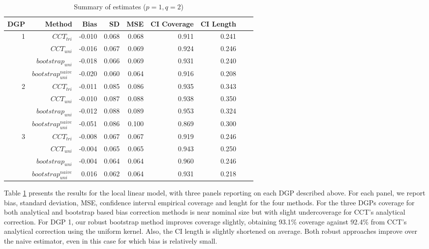 \documentclass[12pt,fleqn]{article}
\begin{document}
\begin{table}[t]
\centering
\begin{tabular}{rrrrrrrrr}
  \toprule
	DGP & Method    & Bias    & SD    & MSE   & CI Coverage & CI Length \\
  \midrule
	1 & $CCT_{tri}$ & -0.010 & 0.068 & 0.068 & 0.911 & 0.241 \\ 
	  & $CCT_{uni}$ & -0.016 & 0.067 & 0.069 & 0.924 & 0.246 \\ 
	  & $bootstrap_{uni}$ & -0.018 & 0.066 & 0.069 & 0.931 & 0.240 \\ 
	  & $bootstrap_{uni}^{naive}$ & -0.020 & 0.060 & 0.064 & 0.916 & 0.208 \\
	\midrule
	2 & $CCT_{tri}$ & -0.011 & 0.085 & 0.086 & 0.935 & 0.343 \\ 
	  & $CCT_{uni}$ & -0.010 & 0.087 & 0.088 & 0.938 & 0.350 \\ 
	  & $bootstrap_{uni}$       & -0.012 & 0.088 & 0.089 & 0.953 & 0.324 \\ 
	  & $bootstrap_{uni}^{naive}$ & -0.051 & 0.086 & 0.100 & 0.869 & 0.300 \\ 
	\midrule
	3 & $CCT_{tri}$ & -0.008 & 0.067 & 0.067 & 0.919 & 0.246 \\ 
	  & $CCT_{uni}$ & -0.004 & 0.065 & 0.065 & 0.943 & 0.250 \\ 
	  & $bootstrap_{uni}$       & -0.004 & 0.064 & 0.064 & 0.960 & 0.246 \\ 
	  & $bootstrap_{uni}^{naive}$ & 0.016 & 0.062 & 0.064 & 0.931 & 0.218 \\ 
  \bottomrule
\end{tabular}
\caption{Summary of estimates ($p = 1, q = 2$)}
\label{Tb: simulation 1}
\end{table}

Table \ref{Tb: simulation 1} presents the results for the local linear model, with three panels reporting on each DGP described above. For each panel, we report bias, standard deviation, MSE, confidence interval empirical coverage and lenght for the four methods. For the three DGPs coverage for
    both analytical and bootstrap based bias correction methods is near nominal size but with slight undercoverage for CCT's analytical correction. For DGP 1, our robust bootstrap method improves coverage slightly, obtaining 93.1\% coverage against 92.4\% from CCT's analytical correction using the uniform kernel. Also, the CI length is slightly shortened on average. Both robust approaches improve over the naive estimator, even in this case for which bias is relatively small.
\end{document}
